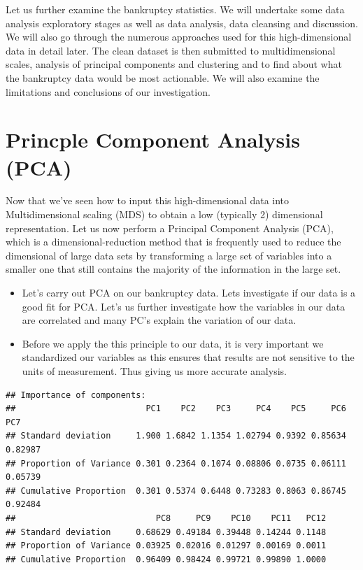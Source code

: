 \documentclass[
]{article}
\begin{document}
Let us further examine the bankruptcy statistics. We will undertake some data analysis exploratory stages as well as data analysis, data cleansing and discussion. We will also go through the numerous approaches used for this high-dimensional data in detail later. The clean dataset is then submitted to multidimensional scales, analysis of principal components and clustering and to find about what the bankruptcy data would be most actionable. We will also examine the limitations and conclusions of our investigation.

\pagebreak

\hypertarget{princple-component-analysis-pca}{%
\section{Princple Component Analysis (PCA)}\label{princple-component-analysis-pca}}

Now that we've seen how to input this high-dimensional data into Multidimensional scaling (MDS) to obtain a low (typically 2) dimensional representation. Let us now perform a Principal Component Analysis (PCA), which is a dimensional-reduction method that is frequently used to reduce the dimensional of large data sets by transforming a large set of variables into a smaller one that still contains the majority of the information in the large set.

\begin{itemize}
\item
  Let's carry out PCA on our bankruptcy data. Lets investigate if our data is a good fit for PCA. Let's us further investigate how the variables in our data are correlated and many PC's explain the variation of our data.
\item
  Before we apply the this principle to our data, it is very important we standardized our variables as this ensures that results are not sensitive to the units of measurement. Thus giving us more accurate analysis.
\end{itemize}

\begin{verbatim}
## Importance of components:
##                          PC1    PC2    PC3     PC4    PC5     PC6     PC7
## Standard deviation     1.900 1.6842 1.1354 1.02794 0.9392 0.85634 0.82987
## Proportion of Variance 0.301 0.2364 0.1074 0.08806 0.0735 0.06111 0.05739
## Cumulative Proportion  0.301 0.5374 0.6448 0.73283 0.8063 0.86745 0.92484
##                            PC8     PC9    PC10    PC11   PC12
## Standard deviation     0.68629 0.49184 0.39448 0.14244 0.1148
## Proportion of Variance 0.03925 0.02016 0.01297 0.00169 0.0011
## Cumulative Proportion  0.96409 0.98424 0.99721 0.99890 1.0000
\end{verbatim}
\end{document}
